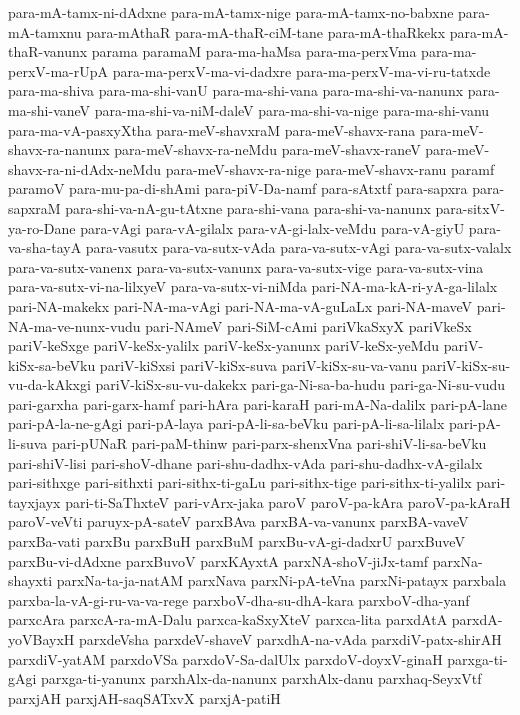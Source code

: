 {para-mA-tamx-ni-dAdxne
para-mA-tamx-nige
para-mA-tamx-no-babxne
para-mA-tamxnu
para-mAthaR
para-mA-thaR-ciM-tane
para-mA-thaRkekx
para-mA-thaR-vanunx
parama
paramaM
para-ma-haMsa
para-ma-perxVma
para-ma-perxV-ma-rUpA
para-ma-perxV-ma-vi-dadxre
para-ma-perxV-ma-vi-ru-tatxde
para-ma-shiva
para-ma-shi-vanU
para-ma-shi-vana
para-ma-shi-va-nanunx
para-ma-shi-vaneV
para-ma-shi-va-niM-daleV
para-ma-shi-va-nige
para-ma-shi-vanu
para-ma-vA-pasxyXtha
para-meV-shavxraM
para-meV-shavx-rana
para-meV-shavx-ra-nanunx
para-meV-shavx-ra-neMdu
para-meV-shavx-raneV
para-meV-shavx-ra-ni-dAdx-neMdu
para-meV-shavx-ra-nige
para-meV-shavx-ranu
paramf
paramoV
para-mu-pa-di-shAmi
para-piV-Da-namf
para-sAtxtf
para-sapxra
para-sapxraM
para-shi-va-nA-gu-tAtxne
para-shi-vana
para-shi-va-nanunx
para-sitxV-ya-ro-Dane
para-vAgi
para-vA-gilalx
para-vA-gi-lalx-veMdu
para-vA-giyU
para-va-sha-tayA
para-vasutx
para-va-sutx-vAda
para-va-sutx-vAgi
para-va-sutx-valalx
para-va-sutx-vanenx
para-va-sutx-vanunx
para-va-sutx-vige
para-va-sutx-vina
para-va-sutx-vi-na-lilxyeV
para-va-sutx-vi-niMda
pari-NA-ma-kA-ri-yA-ga-lilalx
pari-NA-makekx
pari-NA-ma-vAgi
pari-NA-ma-vA-guLaLx
pari-NA-maveV
pari-NA-ma-ve-nunx-vudu
pari-NAmeV
pari-SiM-cAmi
pariVkaSxyX
pariVkeSx
pariV-keSxge
pariV-keSx-yalilx
pariV-keSx-yanunx
pariV-keSx-yeMdu
pariV-kiSx-sa-beVku
pariV-kiSxsi
pariV-kiSx-suva
pariV-kiSx-su-va-vanu
pariV-kiSx-su-vu-da-kAkxgi
pariV-kiSx-su-vu-dakekx
pari-ga-Ni-sa-ba-hudu
pari-ga-Ni-su-vudu
pari-garxha
pari-garx-hamf
pari-hAra
pari-karaH
pari-mA-Na-dalilx
pari-pA-lane
pari-pA-la-ne-gAgi
pari-pA-laya
pari-pA-li-sa-beVku
pari-pA-li-sa-lilalx
pari-pA-li-suva
pari-pUNaR
pari-paM-thinw
pari-parx-shenxVna
pari-shiV-li-sa-beVku
pari-shiV-lisi
pari-shoV-dhane
pari-shu-dadhx-vAda
pari-shu-dadhx-vA-gilalx
pari-sithxge
pari-sithxti
pari-sithx-ti-gaLu
pari-sithx-tige
pari-sithx-ti-yalilx
pari-tayxjayx
pari-ti-SaThxteV
pari-vArx-jaka
paroV
paroV-pa-kAra
paroV-pa-kAraH
paroV-veVti
paruyx-pA-sateV
parxBAva
parxBA-va-vanunx
parxBA-vaveV
parxBa-vati
parxBu
parxBuH
parxBuM
parxBu-vA-gi-dadxrU
parxBuveV
parxBu-vi-dAdxne
parxBuvoV
parxKAyxtA
parxNA-shoV-jiJx-tamf
parxNa-shayxti
parxNa-ta-ja-natAM
parxNava
parxNi-pA-teVna
parxNi-patayx
parxbala
parxba-la-vA-gi-ru-va-va-rege
parxboV-dha-su-dhA-kara
parxboV-dha-yanf
parxcAra
parxcA-ra-mA-Dalu
parxca-kaSxyXteV
parxca-lita
parxdAtA
parxdA-yoVBayxH
parxdeVsha
parxdeV-shaveV
parxdhA-na-vAda
parxdiV-patx-shirAH
parxdiV-yatAM
parxdoVSa
parxdoV-Sa-dalUlx
parxdoV-doyxV-ginaH
parxga-ti-gAgi
parxga-ti-yanunx
parxhAlx-da-nanunx
parxhAlx-danu
parxhaq-SeyxVtf
parxjAH
parxjAH-saqSATxvX
parxjA-patiH
}
